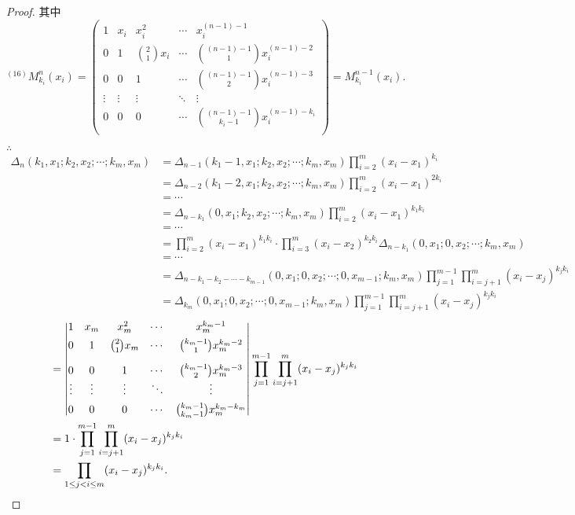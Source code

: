 \documentclass[color=black,device=normal,lang=cn,mode=geye]{elegantnote}
\begin{document}
\begin{landscape}
\begin{proof}
    其中
    \[^{(16)}M_{k_i}^n(x_i)=\begin{pmatrix}
        1 & x_i & x_i^2 & \cdots & x_i^{(n-1)-1} \\[4pt]
        0 & 1 & \binom{2}{1}x_i & \cdots & \binom{(n-1)-1}{1}x_i^{(n-1)-2} \\[10pt]
        0 & 0 & 1 & \cdots & \binom{(n-1)-1}{2}x_i^{(n-1)-3} \\
        \vdots & \vdots & \vdots & \ddots & \vdots \\[4pt]
        0 & 0 & 0 & \cdots & \binom{(n-1)-1}{k_i-1}x_i^{(n-1)-k_i} \\
    \end{pmatrix}=M^{n-1}_{k_i}(x_i).\]

    $\therefore$
    \begin{align*}
        \Delta_n(k_1,x_1;k_2,x_2;\cdots;k_m,x_m) & =\Delta_{n-1}(k_1-1,x_1;k_2,x_2;\cdots;k_m,x_m)\prod\limits_{i=2}^m(x_i-x_1)^{k_i} \\
        & =\Delta_{n-2}(k_1-2,x_1;k_2,x_2;\cdots;k_m,x_m)\prod\limits_{i=2}^m(x_i-x_1)^{2k_i} \\
        & =\cdots \\
        & =\Delta_{n-k_1}(0,x_1;k_2,x_2;\cdots;k_m,x_m)\prod\limits_{i=2}^m(x_i-x_1)^{k_1k_i} \\
        & =\cdots \\
        & =\prod\limits_{i=2}^m(x_i-x_1)^{k_1k_i}\cdot\prod\limits_{i=3}^m(x_i-x_2)^{k_2k_i}\Delta_{n-k_1}(0,x_1;0,x_2;\cdots;k_m,x_m) \\
        & =\cdots \\
        & =\Delta_{n-k_1-k_2-\cdots-k_{m-1}}(0,x_1;0,x_2;\cdots;0,x_{m-1};k_m,x_m)\prod_{j=1}^{m-1}\prod\limits_{i=j+1}^m(x_i-x_j)^{k_jk_i} \\
        & =\Delta_{k_m}(0,x_1;0,x_2;\cdots;0,x_{m-1};k_m,x_m)\prod_{j=1}^{m-1}\prod\limits_{i=j+1}^m(x_i-x_j)^{k_jk_i}
    \end{align*}
    \begin{align*}
        & =\begin{vmatrix}
            1 & x_m & x_m^2 & \cdots & x_m^{k_m-1} \\[4pt]
            0 & 1 & \binom{2}{1}x_m & \cdots & \binom{k_m-1}{1}x_m^{k_m-2} \\[10pt]
            0 & 0 & 1 & \cdots & \binom{k_m-1}{2}x_m^{k_m-3} \\
            \vdots & \vdots & \vdots & \ddots & \vdots \\[4pt]
            0 & 0 & 0 & \cdots & \binom{k_m-1}{k_m-1}x_m^{k_m-k_m} \\
        \end{vmatrix}\prod_{j=1}^{m-1}\prod\limits_{i=j+1}^m(x_i-x_j)^{k_jk_i} \\
        & =1\cdot\prod_{j=1}^{m-1}\prod\limits_{i=j+1}^m(x_i-x_j)^{k_jk_i} \\
        & =\prod\limits_{1\leq j<i\leq m}(x_i-x_j)^{k_jk_i}.\qedhere
    \end{align*}
\end{proof}
\end{landscape}
\end{document}
